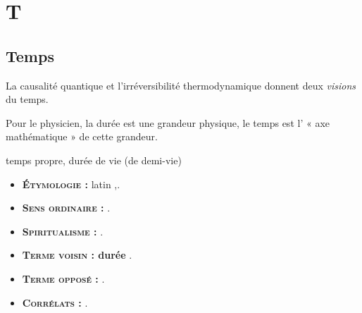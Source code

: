 \chapter{T}
\section{Temps}

La causalité quantique et l'irréversibilité thermodynamique
donnent deux {\it visions} du temps.

Pour le physicien, la durée est une grandeur physique, le
temps est l' « axe mathématique » de cette grandeur.

temps propre, durée de vie (de demi-vie)

{\footnotesize
\begin{itemize}[leftmargin=1cm, label=, itemsep=1pt]
\item {\bf \textsc{Étymologie} :} latin {\it },.
\item {\bf \textsc{Sens ordinaire} :} .
\item {\bf \textsc{Spiritualisme} :} .
\end{itemize}

\begin{itemize}[leftmargin=1cm, label=, itemsep=1pt]
\item {\bf \textsc{Terme voisin} : durée} .
\item {\bf \textsc{Terme opposé} :} .
\item {\bf \textsc{Corrélats} :} .
\end{itemize}
}
